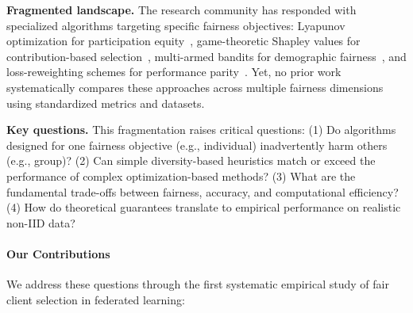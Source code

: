 \documentclass{article}
\begin{document}
\textbf{Fragmented landscape.} The research community has responded with specialized algorithms targeting specific fairness objectives: Lyapunov optimization for participation equity~\cite{li2024longfed}, game-theoretic Shapley values for contribution-based selection~\cite{tastan2024shapfed}, multi-armed bandits for demographic fairness~\cite{bouzamoucha2025mab}, and loss-reweighting schemes for performance parity~\cite{li2020qffl,ezzeldin2021fedfair,mohri2019afl}. Yet, no prior work systematically compares these approaches across multiple fairness dimensions using standardized metrics and datasets.

\textbf{Key questions.} This fragmentation raises critical questions: (1) Do algorithms designed for one fairness objective (e.g., individual) inadvertently harm others (e.g., group)? (2) Can simple diversity-based heuristics match or exceed the performance of complex optimization-based methods? (3) What are the fundamental trade-offs between fairness, accuracy, and computational efficiency? (4) How do theoretical guarantees translate to empirical performance on realistic non-IID data?

\paragraph{Our Contributions}
We address these questions through the first systematic empirical study of fair client selection in federated learning:
\end{document}
